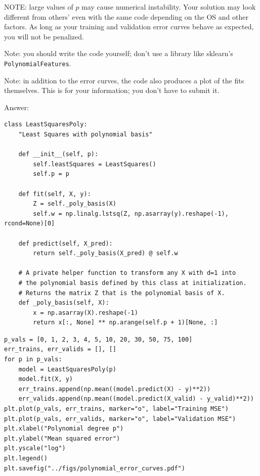 \documentclass{article}
\newenvironment{answer}{\par\begingroup\color{gre}Answer: }{\endgroup}
\begin{document}
NOTE: large values of $p$ may cause numerical instability. Your solution may look different from others' even with the same code depending on the OS and other factors. As long as your training and validation error curves behave as expected, you will not be penalized.

Note: you should write the code yourself; don't use a library like sklearn's \texttt{PolynomialFeatures}.

Note: in addition to the error curves, the code also produces a plot of the fits themselves. This is for your information; you don't have to submit it.


\begin{answer}
\begin{lstlisting}
class LeastSquaresPoly:
    "Least Squares with polynomial basis"

    def __init__(self, p):
        self.leastSquares = LeastSquares()
        self.p = p

    def fit(self, X, y):
        Z = self._poly_basis(X)
        self.w = np.linalg.lstsq(Z, np.asarray(y).reshape(-1), rcond=None)[0]

    def predict(self, X_pred):
        return self._poly_basis(X_pred) @ self.w

    # A private helper function to transform any X with d=1 into
    # the polynomial basis defined by this class at initialization.
    # Returns the matrix Z that is the polynomial basis of X.
    def _poly_basis(self, X):
        x = np.asarray(X).reshape(-1)
        return x[:, None] ** np.arange(self.p + 1)[None, :]
\end{lstlisting}
\begin{lstlisting}
p_vals = [0, 1, 2, 3, 4, 5, 10, 20, 30, 50, 75, 100]
err_trains, err_valids = [], []
for p in p_vals:
    model = LeastSquaresPoly(p)
    model.fit(X, y)
    err_trains.append(np.mean((model.predict(X) - y)**2))
    err_valids.append(np.mean((model.predict(X_valid) - y_valid)**2))
plt.plot(p_vals, err_trains, marker="o", label="Training MSE")
plt.plot(p_vals, err_valids, marker="o", label="Validation MSE")
plt.xlabel("Polynomial degree p")
plt.ylabel("Mean squared error")
plt.yscale("log")
plt.legend()
plt.savefig("../figs/polynomial_error_curves.pdf")
\end{lstlisting}


\end{answer}
\end{document}
